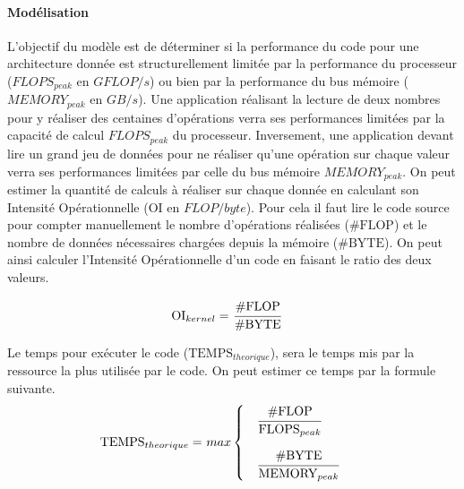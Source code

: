         \paragraph{Modélisation}
            L’objectif du modèle est de déterminer si la performance du code pour une architecture donnée est structurellement limitée par la performance du processeur ($FLOPS_{peak}$ en $GFLOP/s$) ou bien par la performance du bus mémoire ($MEMORY_{peak}$ en $GB/s$). Une application réalisant la lecture de deux nombres pour y réaliser des centaines d’opérations verra ses performances limitées par la capacité de calcul $FLOPS_{peak}$ du processeur. Inversement, une application devant lire un grand jeu de données pour ne réaliser qu'une opération sur chaque valeur verra ses performances limitées par celle du bus mémoire $MEMORY_{peak}$. On peut estimer la quantité de calculs à réaliser sur chaque donnée en calculant son Intensité Opérationnelle  ($\text{OI}$ en $FLOP/byte$). Pour cela il faut lire le code source pour compter manuellement le nombre d’opérations réalisées ($\text{\#FLOP}$) et le nombre de données nécessaires chargées depuis la mémoire ($\text{\#BYTE}$). On peut ainsi calculer l’Intensité Opérationnelle d’un code en faisant le ratio des deux valeurs.
            
            \begin{equation}
            \begin{aligned}
                    \text{OI}_{kernel} =\ &\cfrac{\text{\#FLOP}}{\text{\#BYTE}}
            \end{aligned}
            \end{equation}
            
            Le temps pour exécuter le code ($\text{TEMPS}_{theorique}$), sera le temps mis par la ressource la plus utilisée par le code. On peut estimer ce temps par la formule suivante.
            \begin{equation}
            \begin{aligned}
                 \text{TEMPS}_{theorique} =\  &max 
                 \begin{cases} 
                    \quad \cfrac{\text{\#FLOP}}{\text{FLOPS}_{peak}}    \\[15pt]
                    \quad \cfrac{\text{\#BYTE}}{\text{MEMORY}_{peak}}
                \end{cases}
            \end{aligned}
            \end{equation}
            
